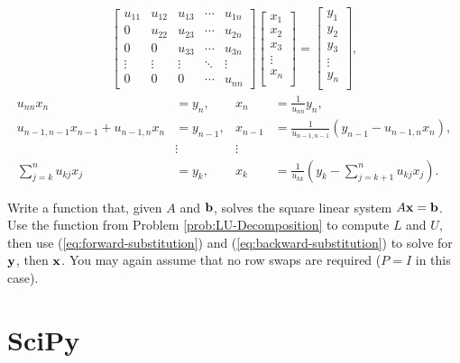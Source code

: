 \begin{align*}
\left[\begin{array}{ccccc}
u_{11} & u_{12} & u_{13} & \cdots & u_{1n} \\
0      & u_{22} & u_{23} & \cdots & u_{2n} \\
0      & 0      & u_{33} & \cdots & u_{3n} \\
\vdots & \vdots & \vdots & \ddots & \vdots \\
0      & 0      & 0      & \cdots & u_{nn}
\end{array}\right]
\left[\begin{array}{c}
x_1 \\ x_2 \\ x_3 \\ \vdots \\ x_n \\
\end{array}\right]
=
\left[\begin{array}{c}
y_1 \\ y_2 \\ y_3 \\ \vdots \\ y_n \\
\end{array}\right],
\end{align*}
\begin{align}
\nonumber u_{nn}x_n &= y_n, & x_n &= \frac{1}{u_{nn}}y_n, \\
\nonumber u_{n-1,n-1}x_{n-1} + u_{n-1,n}x_{n} &= y_{n-1}, & x_{n-1} &= \frac{1}{u_{n-1,n-1}}\left(y_{n-1} - u_{n-1,n}x_{n}\right),\\
\nonumber & \vdots & \vdots & \\
\sum_{j=k}^{n}u_{kj}x_j &= y_k, & x_k &= \frac{1}{u_{kk}}\left(y_k - \sum_{j=k+1}^{n}u_{kj}x_j\right).
\label{eq:backward-substitution}
\end{align}

\begin{problem} %
Write a function that, given $A$ and $\mathbf{b}$, solves the square linear system $A\mathbf{x} = \mathbf{b}$.
Use the function from Problem \ref{prob:LU-Decomposition} to compute $L$ and $U$, then use (\ref{eq:forward-substitution}) and (\ref{eq:backward-substitution}) to solve for $\mathbf{y}$, then $\mathbf{x}$.
You may again assume that no row swaps are required ($P = I$ in this case).
\label{prob:substitute-solve}
\end{problem}

\section*{SciPy} %


